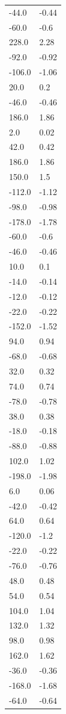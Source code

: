 \begin{longtable}{ll}
-44.0 & -0.44 \\
-60.0 & -0.6 \\
228.0 & 2.28 \\
-92.0 & -0.92 \\
-106.0 & -1.06 \\
20.0 & 0.2 \\
-46.0 & -0.46 \\
186.0 & 1.86 \\
2.0 & 0.02 \\
42.0 & 0.42 \\
186.0 & 1.86 \\
150.0 & 1.5 \\
-112.0 & -1.12 \\
-98.0 & -0.98 \\
-178.0 & -1.78 \\
-60.0 & -0.6 \\
-46.0 & -0.46 \\
10.0 & 0.1 \\
-14.0 & -0.14 \\
-12.0 & -0.12 \\
-22.0 & -0.22 \\
-152.0 & -1.52 \\
94.0 & 0.94 \\
-68.0 & -0.68 \\
32.0 & 0.32 \\
74.0 & 0.74 \\
-78.0 & -0.78 \\
38.0 & 0.38 \\
-18.0 & -0.18 \\
-88.0 & -0.88 \\
102.0 & 1.02 \\
-198.0 & -1.98 \\
6.0 & 0.06 \\
-42.0 & -0.42 \\
64.0 & 0.64 \\
-120.0 & -1.2 \\
-22.0 & -0.22 \\
-76.0 & -0.76 \\
48.0 & 0.48 \\
54.0 & 0.54 \\
104.0 & 1.04 \\
132.0 & 1.32 \\
98.0 & 0.98 \\
162.0 & 1.62 \\
-36.0 & -0.36 \\
-168.0 & -1.68 \\
-64.0 & -0.64 \\

\end{longtable}
